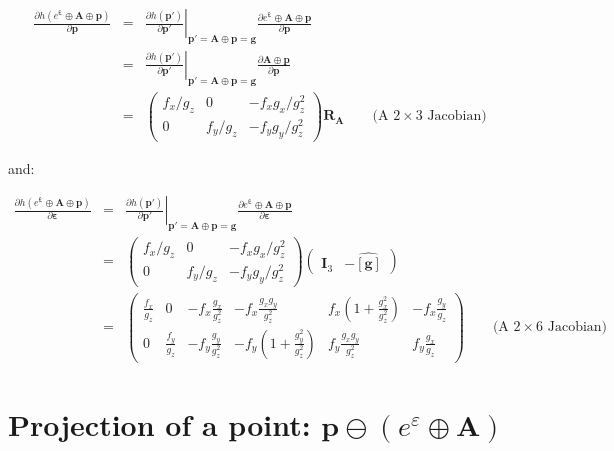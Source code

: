 \documentclass[a4paper,11pt]{report}
\newcommand{\E}{{\bm{\varepsilon}}}
\newcommand{\A}{{\mathbf{A}}}
\begin{document}
\begin{eqnarray}
\frac{\partial h(e^\E \oplus \A \oplus \mathbf{p})}{\partial \mathbf{p}}
&=&
\left. \frac{\partial h(\mathbf{p'})}{\partial \mathbf{p'}} \right|_{ \mathbf{p'} = \A \oplus \mathbf{p} = \mathbf{g} }
\frac{\partial e^\E \oplus \A \oplus \mathbf{p} }{\partial \mathbf{p}} \\
&=&
\left. \frac{\partial h(\mathbf{p'})}{\partial \mathbf{p'}} \right|_{ \mathbf{p'} = \A \oplus \mathbf{p} = \mathbf{g} }
\frac{\partial \A \oplus \mathbf{p} }{\partial \mathbf{p}} \\
&=&
\left(
\begin{array}{ccc}
 f_x / g_z   &    0    &  -f_x g_x / g_z^2   \\
 0 & f_y / g_z  &  -f_y g_y / g_z^2
\end{array}
\right)
\mathbf{R_A}
\quad\quad \text{(A $2 \times 3$ Jacobian)}
\end{eqnarray}

\noindent and:

\begin{eqnarray}
\frac{\partial h(e^\E \oplus \A \oplus \mathbf{p})}{\partial \mathbf{\E}}
&=&
\left. \frac{\partial h(\mathbf{p'})}{\partial \mathbf{p'}} \right|_{ \mathbf{p'} = \A \oplus \mathbf{p} = \mathbf{g} }
\frac{\partial e^\E \oplus \A \oplus \mathbf{p} }{\partial \E} \\
&=&
\left(
\begin{array}{ccc}
 f_x / g_z   &    0    &  -f_x g_x / g_z^2   \\
 0 & f_y / g_z  &  -f_y g_y / g_z^2
\end{array}
\right)
\left(
\begin{array}{cc}
 \mathbf{I}_3   & - \widehat{\left[ \mathbf{g} \right]}
\end{array}
\right) \\
&=&
\left(
\begin{array}{cccccc}
 \frac{f_x}{g_z}  &
 0 &
 -f_x\frac{g_x}{g_z^2} &
 -f_x \frac{g_x g_y}{g_z^2} &
  f_x  (1 + \frac{g_x^2}{g_z^2} )  &
 -f_x \frac{g_y}{g_z}
\\
 0 &
 \frac{f_y}{g_z}  &
 -f_y\frac{g_y}{g_z^2}
 &
  -f_y (1 + \frac{g_y^2}{g_z^2}) &
  f_y \frac{g_x g_y}{g_z^2} &
  f_y \frac{g_x}{g_z}
\end{array}
\right)
\quad\quad \text{(A $2 \times 6$ Jacobian)} \nonumber
\end{eqnarray}



\newpage

\section{Projection of a point: $\mathbf{p} \ominus (e^\varepsilon \oplus \mathbf{A})$}
\end{document}
